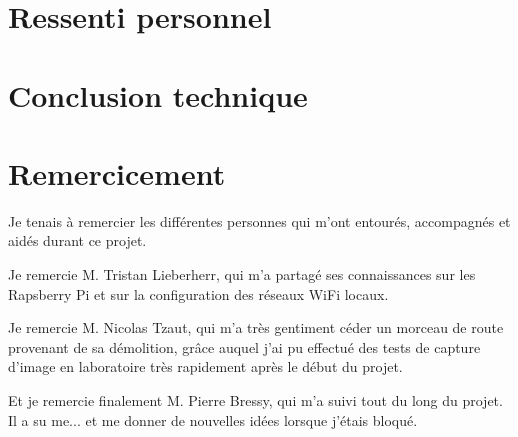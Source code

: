 \section{Ressenti personnel}

\section{Conclusion technique}

\section{Remercicement}
Je tenais à remercier les différentes personnes qui m'ont entourés, accompagnés et aidés durant ce projet.

Je remercie M. Tristan Lieberherr, qui m'a partagé ses connaissances sur les Rapsberry Pi et sur la configuration des réseaux WiFi locaux.

Je remercie M. Nicolas Tzaut, qui m'a très gentiment céder un morceau de route provenant de sa démolition, grâce auquel j'ai pu effectué
des tests de capture d'image en laboratoire très rapidement après le début du projet.

Et je remercie finalement M. Pierre Bressy, qui m'a suivi tout du long du projet. Il a su me... et me donner de nouvelles idées lorsque
j'étais bloqué.
\vfil
\hspace{8cm}\makeatletter\@author\makeatother\par
\hspace{8cm}\begin{minipage}{5cm}
    \printsignature
\end{minipage}

